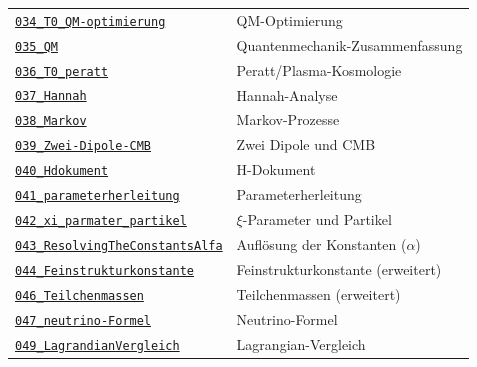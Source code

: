 {\begin{longtable}{@{}>{\raggedright\arraybackslash}p{} >{\raggedright\arraybackslash}p{}@{}}
\href{https://github.com/jpascher/T0-Time-Mass-Duality/blob/main/2/pdf/034_T0_QM-optimierung_De.pdf}{\texttt{034\_T0\_QM-optimierung}} & QM-Optimierung \\
\href{https://github.com/jpascher/T0-Time-Mass-Duality/blob/main/2/pdf/035_QM_De.pdf}{\texttt{035\_QM}} & Quantenmechanik-Zusammenfassung \\
\href{https://github.com/jpascher/T0-Time-Mass-Duality/blob/main/2/pdf/036_T0_peratt_De.pdf}{\texttt{036\_T0\_peratt}} & Peratt/Plasma-Kosmologie \\
\href{https://github.com/jpascher/T0-Time-Mass-Duality/blob/main/2/pdf/037_Hannah_De.pdf}{\texttt{037\_Hannah}} & Hannah-Analyse \\
\href{https://github.com/jpascher/T0-Time-Mass-Duality/blob/main/2/pdf/038_Markov_De.pdf}{\texttt{038\_Markov}} & Markov-Prozesse \\
\href{https://github.com/jpascher/T0-Time-Mass-Duality/blob/main/2/pdf/039_Zwei-Dipole-CMB_De.pdf}{\texttt{039\_Zwei-Dipole-CMB}} & Zwei Dipole und CMB \\
\href{https://github.com/jpascher/T0-Time-Mass-Duality/blob/main/2/pdf/040_Hdokument_De.pdf}{\texttt{040\_Hdokument}} & H-Dokument \\
\href{https://github.com/jpascher/T0-Time-Mass-Duality/blob/main/2/pdf/041_parameterherleitung_De.pdf}{\texttt{041\_parameterherleitung}} & Parameterherleitung \\
\href{https://github.com/jpascher/T0-Time-Mass-Duality/blob/main/2/pdf/042_xi_parmater_partikel_De.pdf}{\texttt{042\_xi\_parmater\_partikel}} & $\xi$-Parameter und Partikel \\
\href{https://github.com/jpascher/T0-Time-Mass-Duality/blob/main/2/pdf/043_ResolvingTheConstantsAlfa_De.pdf}{\texttt{043\_ResolvingTheConstantsAlfa}} & Auflösung der Konstanten ($\alpha$) \\
\href{https://github.com/jpascher/T0-Time-Mass-Duality/blob/main/2/pdf/044_Feinstrukturkonstante_De.pdf}{\texttt{044\_Feinstrukturkonstante}} & Feinstrukturkonstante (erweitert) \\
\href{https://github.com/jpascher/T0-Time-Mass-Duality/blob/main/2/pdf/046_Teilchenmassen_De.pdf}{\texttt{046\_Teilchenmassen}} & Teilchenmassen (erweitert) \\
\href{https://github.com/jpascher/T0-Time-Mass-Duality/blob/main/2/pdf/047_neutrino-Formel_De.pdf}{\texttt{047\_neutrino-Formel}} & Neutrino-Formel \\
\href{https://github.com/jpascher/T0-Time-Mass-Duality/blob/main/2/pdf/049_LagrandianVergleich_De.pdf}{\texttt{049\_LagrandianVergleich}} & Lagrangian-Vergleich \\

\end{longtable}}
